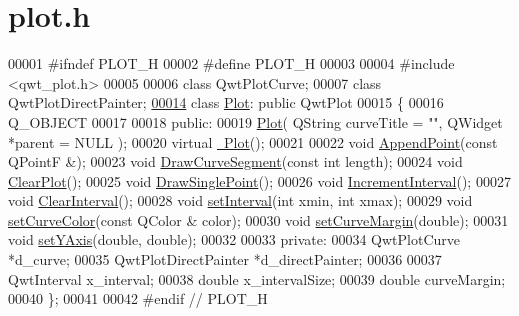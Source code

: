 \hypertarget{plot_8h_source}{}\section{plot.\+h}
\label{plot_8h_source}

\begin{DoxyCode}
00001 \textcolor{preprocessor}{#ifndef PLOT\_H}
00002 \textcolor{preprocessor}{#define PLOT\_H}
00003 
00004 \textcolor{preprocessor}{#include <qwt\_plot.h>}
00005 
00006 \textcolor{keyword}{class }QwtPlotCurve;
00007 \textcolor{keyword}{class }QwtPlotDirectPainter;
\hypertarget{plot_8h_source.tex_l00014}{}\hyperlink{classPlot}{00014} \textcolor{keyword}{class }\hyperlink{classPlot}{Plot}: \textcolor{keyword}{public} QwtPlot
00015 \{
00016     Q\_OBJECT
00017 
00018 \textcolor{keyword}{public}:
00019     \hyperlink{classPlot_a26093e28c6d18a6324f421278474538d}{Plot}( QString curveTitle = \textcolor{stringliteral}{""},  QWidget *parent = NULL );
00020     \textcolor{keyword}{virtual} \hyperlink{classPlot_a277e9c79c4357b3a317d74d61dabefcf}{~Plot}();
00021 
00022     \textcolor{keywordtype}{void} \hyperlink{classPlot_a983cc18b014a7da6a9ebd18d941a2810}{AppendPoint}(\textcolor{keyword}{const} QPointF &);
00023     \textcolor{keywordtype}{void} \hyperlink{classPlot_a19036300cad7a088f1453ff17162490f}{DrawCurveSegment}(\textcolor{keyword}{const} \textcolor{keywordtype}{int} length);
00024     \textcolor{keywordtype}{void} \hyperlink{classPlot_af2b50b6923556e2bb04fd0b0dc7da318}{ClearPlot}();
00025     \textcolor{keywordtype}{void} \hyperlink{classPlot_acb0268b78902a0105c27e456e272e9b0}{DrawSinglePoint}();
00026     \textcolor{keywordtype}{void} \hyperlink{classPlot_a3deed9a4018d838d2c21d37e7b550fe0}{IncrementInterval}();
00027     \textcolor{keywordtype}{void} \hyperlink{classPlot_a02379d1d3094929aff97df8aa5c83fd6}{ClearInterval}();
00028     \textcolor{keywordtype}{void} \hyperlink{classPlot_a932e846d63f6e6192485fa8402c1c7bf}{setInterval}(\textcolor{keywordtype}{int} xmin, \textcolor{keywordtype}{int} xmax);
00029     \textcolor{keywordtype}{void} \hyperlink{classPlot_af2d2fb49ecae0a12196606a153f5bee0}{setCurveColor}(\textcolor{keyword}{const} QColor & color);
00030     \textcolor{keywordtype}{void} \hyperlink{classPlot_a06a7d71c936d5e303fddbed3aac9b99f}{setCurveMargin}(\textcolor{keywordtype}{double});
00031     \textcolor{keywordtype}{void} \hyperlink{classPlot_a783f800388cb6615b60efbafa523fbf0}{setYAxis}(\textcolor{keywordtype}{double}, \textcolor{keywordtype}{double});
00032 
00033 \textcolor{keyword}{private}:
00034     QwtPlotCurve *d\_curve;
00035     QwtPlotDirectPainter *d\_directPainter;
00036 
00037     QwtInterval x\_interval;
00038     \textcolor{keywordtype}{double} x\_intervalSize;
00039     \textcolor{keywordtype}{double} curveMargin;
00040 \};
00041 
00042 \textcolor{preprocessor}{#endif // PLOT\_H}
\end{DoxyCode}
